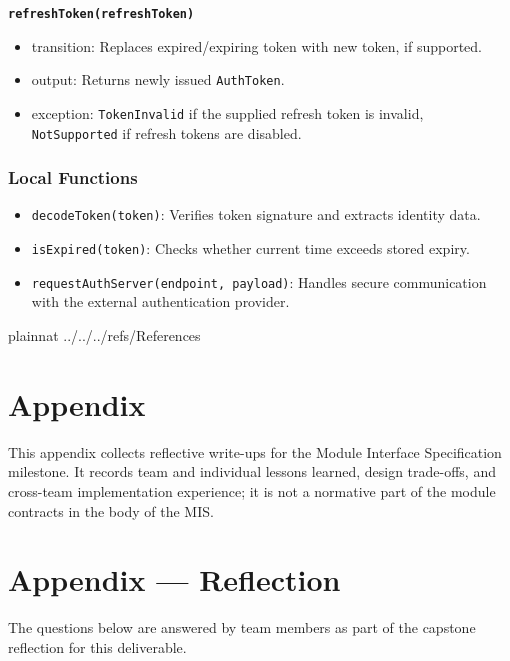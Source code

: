 \documentclass[12pt, titlepage]{article}
\begin{document}
\noindent\textbf{\texttt{refreshToken(refreshToken)}}
\begin{itemize}
\item transition: Replaces expired/expiring token with new token, if supported.
\item output: Returns newly issued \texttt{AuthToken}.
\item exception: \texttt{TokenInvalid} if the supplied refresh token is invalid, \texttt{NotSupported} if refresh tokens are disabled.
\end{itemize}

\subsubsection{Local Functions}

\begin{itemize}
    \item \texttt{decodeToken(token)}: Verifies token signature and extracts identity data.
    \item \texttt{isExpired(token)}: Checks whether current time exceeds stored expiry.
    \item \texttt{requestAuthServer(endpoint, payload)}: Handles secure communication with the external authentication provider.
\end{itemize}


\newpage

 {plainnat}
 {../../../refs/References}

\newpage

\section{Appendix} \label{Appendix}

\noindent
This appendix collects reflective write-ups for the Module Interface Specification milestone.
It records team and individual lessons learned, design trade-offs, and cross-team implementation experience; it is not a normative part of the module contracts in the body of the MIS.

\newpage{}

\section*{Appendix --- Reflection}

\noindent
The questions below are answered by team members as part of the capstone reflection for this deliverable.
\end{document}
